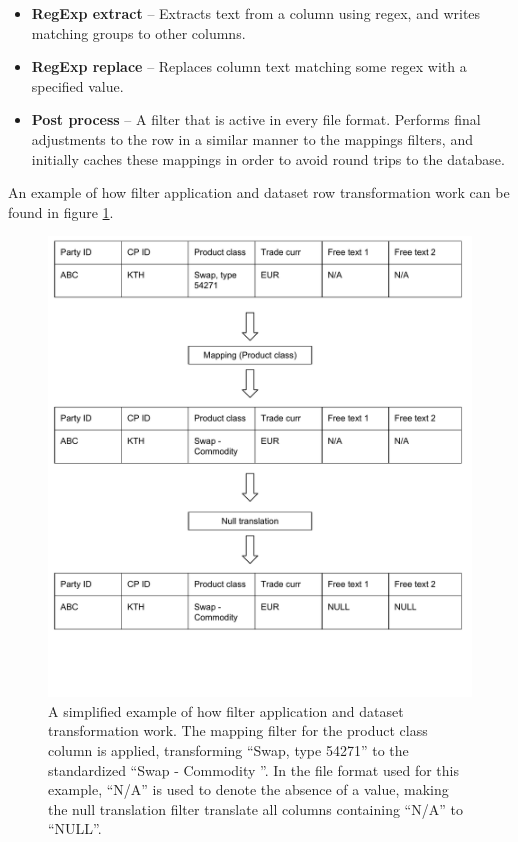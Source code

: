 \begin{itemize}
\item \textbf{RegExp extract} --
Extracts text from a column using regex, and writes matching groups to other columns.

\item \textbf{RegExp replace} --
Replaces column text matching some regex with a specified value.

\item \textbf{Post process} --
A filter that is active in every file format. Performs final adjustments to the row in a similar manner to the mappings filters, and
initially caches these mappings in order to avoid round trips to the database.

\end{itemize}

An example of how filter application and dataset row transformation work can be found in figure \ref{fig:filter_diagram}.

\begin{figure}[ht]
  \centering
  \includegraphics[width=120mm]{figures/filter_diagram.pdf}
  \caption[Filter application example.]{A simplified example of how filter application and dataset transformation work. The mapping filter for the
  product class column is applied, transforming ``Swap, type 54271'' to the standardized ``Swap - Commodity ''. In the file format used for this example,
  ``N/A'' is used to denote the absence of a value, making the null translation filter translate all columns containing ``N/A'' to ``NULL''.}
  \label{fig:filter_diagram}
\end{figure}

